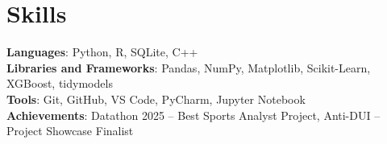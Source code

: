 \documentclass[letterpaper,11pt]{article}
\begin{document}
\section{Skills}
 \begin{itemize}[leftmargin=0.15in, label={}]
    \small{\item{
     \textbf{Languages}{: Python, R, SQLite, C++} \\
     \textbf{Libraries and Frameworks}{: Pandas, NumPy, Matplotlib, Scikit-Learn, XGBoost, tidymodels} \\
     \textbf{Tools}{: Git, GitHub, VS Code, PyCharm, Jupyter Notebook} \\
     \textbf{Achievements}{: Datathon 2025 -- Best Sports Analyst Project, Anti-DUI -- Project Showcase Finalist}
    }}
 \end{itemize}
\end{document}
